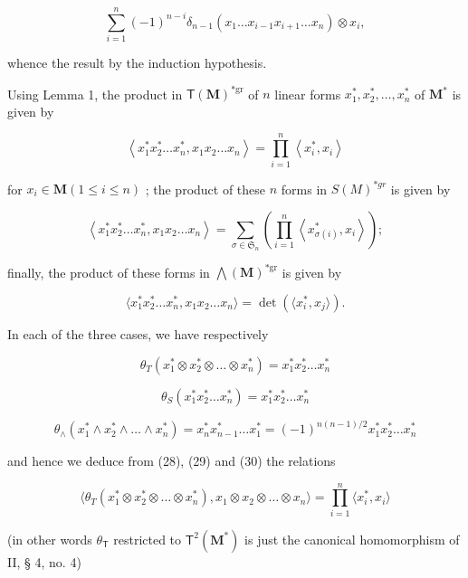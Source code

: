 \[
\sum_ {i = 1} ^ {n} (- 1) ^ {n - i} \delta_ {n - 1} (x _ {1} \dots x _ {i - 1} x _ {i + 1} \dots x _ {n}) \otimes x _ {i},
\]

whence the result by the induction hypothesis.

Using Lemma 1, the product in \(\mathsf{T}(\mathbf{M})^{*\mathrm{gr}}\) of \(n\) linear forms \(x_{1}^{*}, x_{2}^{*}, \ldots, x_{n}^{*}\) of \(\mathbf{M}^{*}\) is given by

\[
\left\langle x _ {1} ^ {*} x _ {2} ^ {*} \dots x _ {n} ^ {*}, x _ {1} x _ {2} \dots x _ {n} \right\rangle = \prod_ {i = 1} ^ {n} \left\langle x _ {i} ^ {*}, x _ {i} \right\rangle\tag{28}
\]

for \(x_{i} \in \mathbf{M} (1 \leqslant i \leqslant n)\) ; the product of these \(n\) forms in \(S(M)^{*gr}\) is given by

\[
\left\langle x _ {1} ^ {*} x _ {2} ^ {*} \dots x _ {n} ^ {*}, x _ {1} x _ {2} \dots x _ {n} \right\rangle = \sum_ {\sigma \in \mathfrak {S} _ {n}} \left(\prod_ {i = 1} ^ {n} \left\langle x _ {\sigma (i)} ^ {*}, x _ {i} \right\rangle\right);\tag{29}
\]

finally, the product of these forms in \(\bigwedge (\mathbf{M})^{*\mathrm{gr}}\) is given by

\[
\langle x _ {1} ^ {*} x _ {2} ^ {*} \dots x _ {n} ^ {*}, x _ {1} x _ {2} \dots x _ {n} \rangle = \det (\langle x _ {i} ^ {*}, x _ {j} \rangle).\tag{30}
\]

In each of the three cases, we have respectively

\[
\theta_ {T} (x _ {1} ^ {*} \otimes x _ {2} ^ {*} \otimes \dots \otimes x _ {n} ^ {*}) = x _ {1} ^ {*} x _ {2} ^ {*} \dots x _ {n} ^ {*}
\]

\[
\theta_ {S} (x _ {1} ^ {*} x _ {2} ^ {*} \dots x _ {n} ^ {*}) = x _ {1} ^ {*} x _ {2} ^ {*} \dots x _ {n} ^ {*}
\]

\[
\theta_ {\wedge} (x _ {1} ^ {*} \wedge x _ {2} ^ {*} \wedge \dots \wedge x _ {n} ^ {*}) = x _ {n} ^ {*} x _ {n - 1} ^ {*} \dots x _ {1} ^ {*} = (- 1) ^ {n (n - 1) / 2} x _ {1} ^ {*} x _ {2} ^ {*} \dots x _ {n} ^ {*}
\]

and hence we deduce from (28), (29) and (30) the relations

\[
\langle \theta_ {T} (x _ {1} ^ {*} \otimes x _ {2} ^ {*} \otimes \dots \otimes x _ {n} ^ {*}), x _ {1} \otimes x _ {2} \otimes \dots \otimes x _ {n} \rangle = \prod_ {i = 1} ^ {n} \langle x _ {i} ^ {*}, x _ {i} \rangle\tag{28 bis}
\]

(in other words \(\theta_{\mathsf{T}}\) restricted to \(\mathsf{T}^2 (\mathbf{M}^*)\) is just the canonical homomorphism of II, § 4, no. 4)

